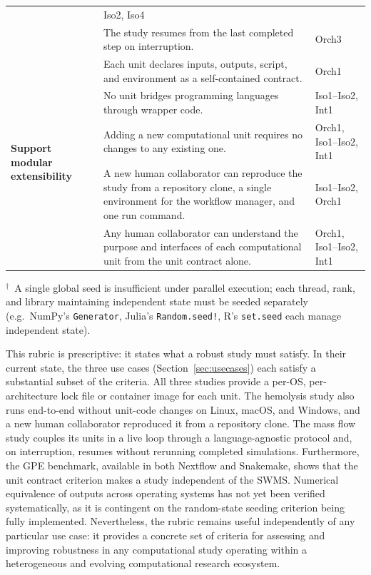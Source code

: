\documentclass{eceasst}
\begin{document}
\begin{table}[htpb]
\begin{tabularx}{\linewidth}{p{2.6cm}Xp{2.0cm}}
      & Iso2, Iso4 \\
      & The study resumes from the last completed step on interruption.
      & Orch3 \\
    \midrule
    \multirow{5}{2.6cm}{\textbf{Support modular extensibility}}
      & Each unit declares inputs, outputs, script, and environment as a
        self-contained contract.
      & Orch1 \\
      & No unit bridges programming languages through wrapper code.
      & Iso1--Iso2, Int1 \\
      & Adding a new computational unit requires no changes to any existing one.
      & Orch1, Iso1--Iso2, Int1 \\
      & A new human collaborator can reproduce the study from a repository clone, a single
        environment for the workflow manager, and one run command.
      & Iso1--Iso2, Orch1 \\
      & Any human collaborator can understand the purpose and interfaces of each computational unit from the unit contract alone.
      & Orch1, Iso1--Iso2, Int1 \\
    \bottomrule
  \end{tabularx}

  \smallskip
  \raggedright\footnotesize{$^\dagger$~A single global seed is insufficient
  under parallel execution; each thread, rank, and library maintaining
  independent state must be seeded separately (e.g.\ NumPy's
  \texttt{Generator}, Julia's \texttt{Random.seed!}, R's \texttt{set.seed}
  each manage independent state).}
\end{table}

This rubric is prescriptive: it states what a robust study must satisfy.
In their current state, the three use cases (Section~\ref{sec:usecases}) each satisfy a substantial subset of the criteria.
All three studies provide a per-OS, per-architecture lock file or container image for each unit.
The hemolysis study also runs end-to-end without unit-code changes on Linux, macOS, and Windows, and a new human collaborator reproduced it from a repository clone.
The mass flow study couples its units in a live loop through a language-agnostic protocol and, on interruption, resumes without rerunning completed simulations.
Furthermore, the GPE benchmark, available in both Nextflow and Snakemake, shows that the unit contract criterion makes a study independent of the SWMS.
Numerical equivalence of outputs across operating systems has not yet been verified systematically, as it is contingent on the random-state seeding criterion being fully implemented.
Nevertheless, the rubric remains useful independently of any particular use case: it provides a concrete set of criteria for assessing and improving robustness in any computational study operating within a heterogeneous and evolving computational research ecosystem.
\end{document}
